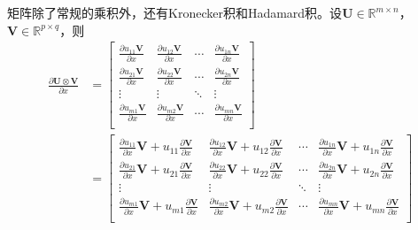 \documentclass{ctexart}
\theoremstyle{definition}
\def \Uv {\mathbf{U}}
\def \Vv {\mathbf{V}}
\def \Rbb {\mathbb{R}}
\begin{document}
矩阵除了常规的乘积外，还有Kronecker积和Hadamard积。设$\Uv \in \Rbb^{m \times n}$，$\Vv \in \Rbb^{p \times q}$，则
\begin{align*}
    \frac{\partial \Uv \otimes \Vv}{\partial x} & = \begin{bmatrix}
        \frac{\partial u_{11} \Vv}{\partial x} & \frac{\partial u_{12} \Vv}{\partial x} & \cdots & \frac{\partial u_{1n} \Vv}{\partial x} \\
        \frac{\partial u_{21} \Vv}{\partial x} & \frac{\partial u_{22} \Vv}{\partial x} & \cdots & \frac{\partial u_{2n} \Vv}{\partial x} \\
        \vdots                                 & \vdots                                 & \ddots & \vdots                                 \\
        \frac{\partial u_{m1} \Vv}{\partial x} & \frac{\partial u_{m2} \Vv}{\partial x} & \cdots & \frac{\partial u_{mn} \Vv}{\partial x} \\
    \end{bmatrix}                                                                \\
                                                & = \begin{bmatrix}
        \frac{\partial u_{11}}{\partial x} \Vv + u_{11} \frac{\partial \Vv}{\partial x} & \frac{\partial u_{12}}{\partial x} \Vv + u_{12} \frac{\partial \Vv}{\partial x} & \cdots & \frac{\partial u_{1n}}{\partial x} \Vv + u_{1n} \frac{\partial \Vv}{\partial x} \\
        \frac{\partial u_{21}}{\partial x} \Vv + u_{21} \frac{\partial \Vv}{\partial x} & \frac{\partial u_{22}}{\partial x} \Vv + u_{22} \frac{\partial \Vv}{\partial x} & \cdots & \frac{\partial u_{2n}}{\partial x} \Vv + u_{2n} \frac{\partial \Vv}{\partial x} \\
        \vdots                                                                          & \vdots                                                                          & \ddots & \vdots                                                                          \\
        \frac{\partial u_{m1}}{\partial x} \Vv + u_{m1} \frac{\partial \Vv}{\partial x} & \frac{\partial u_{m2}}{\partial x} \Vv + u_{m2} \frac{\partial \Vv}{\partial x} & \cdots & \frac{\partial u_{mn}}{\partial x} \Vv + u_{mn} \frac{\partial \Vv}{\partial x} \\
    \end{bmatrix}                                                                \\

\end{align*}
\end{document}
